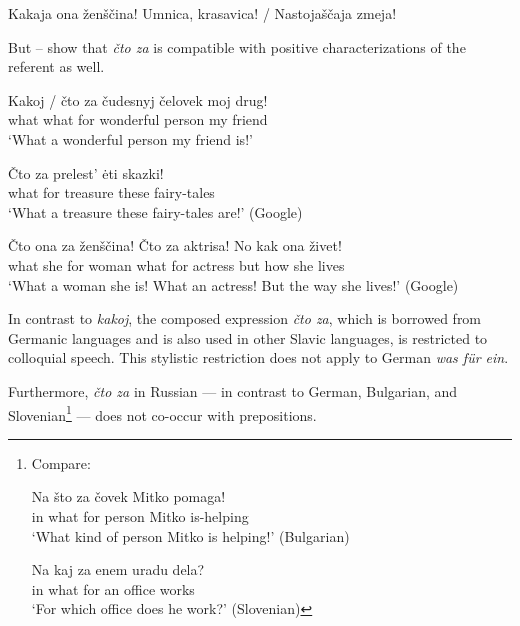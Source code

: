 \documentclass[output=paper,colorlinks,citecolor=brown]{langscibook}
\begin{document}
\ea \label{ex:zi08:6}
    Kakaja ona ženščina! Umnica, krasavica! /  Nastojaščaja zmeja!
\z

\noindent But -- show that \textit{čto za} is compatible with positive characterizations of the referent as well.

\ea \label{ex:zi08:7}
    \gll Kakoj / čto za čudesnyj čelovek moj drug!\\
    what {} what for wonderful person my friend\\
    \glt `What a wonderful person my friend is!'
    
\z

\ea \label{ex:zi08:8}
    \gll Čto za prelest' ėti skazki!\\
    what for treasure these fairy-tales\\
    \glt `What a treasure these fairy-tales are!' \xspace\hfill(Google)
\z

\ea \label{ex:zi08:9}
    \gll Čto ona za ženščina! Čto za aktrisa! No kak ona živet!\\
    what she for woman what for actress but how she lives\\
    \glt `What a woman she is! What an actress! But the way she lives!'
    \xspace\hfill(Google)
\z

\noindent In contrast to \textit{kakoj}, the composed expression \textit{čto za}, which is borrowed from Germanic languages and is also used in other Slavic languages, is restricted to colloquial speech. This stylistic restriction does not apply to German \textit{was für ein}. 

Furthermore, \textit{čto za} in Russian — in contrast to German, Bulgarian, and Slovenian\footnote{\label{fn:zi08:2}Compare:

\ea \label{ex:zi08:fn2i}
    \gll Na što za čovek Mitko pomaga!\\
    in what for person Mitko is-helping\\
    \glt `What kind of person Mitko is helping!'
    \xspace\hfill(Bulgarian)
\z

\ea \label{ex:zi08:fn2ii}
    \gll Na kaj za enem uradu dela?\\
    in what for an office works\\
    \glt `For which office does he work?'
    \xspace\hfill(Slovenian)
\z

} — does not co-occur with prepositions.
\end{document}
